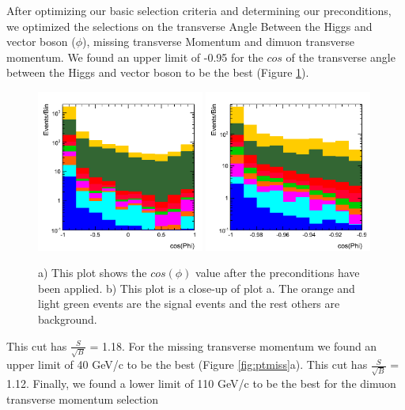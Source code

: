 \documentclass[12pt]{article}
\begin{document}
After optimizing our basic selection criteria and determining our preconditions, 
we optimized the selections on the transverse Angle Between the Higgs and vector boson ($\phi$), missing transverse Momentum and dimuon transverse momentum. 
We found an upper limit of -0.95 for the $cos$ of the transverse angle between the Higgs and vector boson to be the best (Figure \ref{fig:cosPhi}). 
\begin{figure}[!hbtp]
\begin{center}
    \includegraphics[width=0.49\textwidth]{images/Hist_MuMu2JetPhiBeforeCuts.png} %
    \includegraphics[width=0.49\textwidth]{images/Hist_MuMu2JetPhiZoomB4Cut.png}
    \caption{ \label{fig:cosPhi}
         a) This plot shows the $cos(\phi)$ value after the preconditions have been applied. b) This plot is a close-up of plot a.
	 The orange and light green events are the signal events and the rest others are background.
      }
\end{center}
\end{figure} 
This cut has $\frac{S}{\sqrt{B}}$ = 1.18. For the missing transverse momentum we found an upper limit of 40 GeV/c to be the best (Figure \ref{fig:ptmiss}a).
This cut has $\frac{S}{\sqrt{B}}$ = 1.12. Finally, we found a lower limit of 110 GeV/c to be the best for the dimuon transverse momentum selection 
\end{document}
